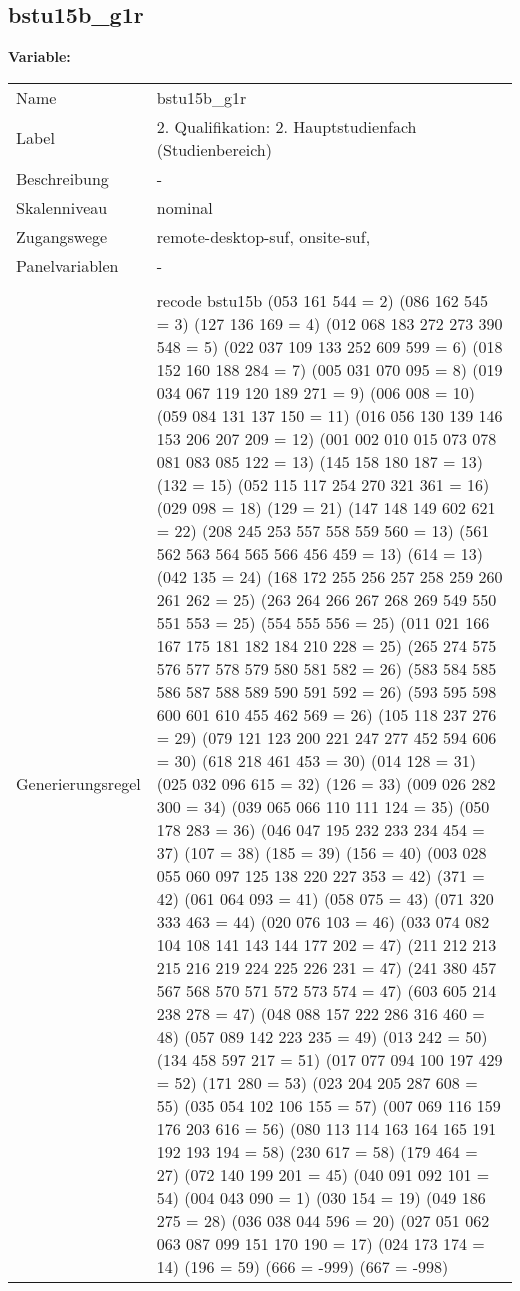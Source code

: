 	
	
	\subsection{bstu15b\_g1r}
	\label{subSection:bstu15b_g1r}

	\noindent\textbf{Variable:}\\
		\begin{tabular}{lL{11.3cm}}
			\label{tableVariable:bstu15b_g1r}
			Name & bstu15b\_g1r \\
			Label & 2. Qualifikation: 2. Hauptstudienfach (Studienbereich) \\
			Beschreibung & - \\
			Skalenniveau & nominal \\
			Zugangswege &
				remote-desktop-suf,
				onsite-suf,
 \\
			Panelvariablen & -
			 \\
			 \\
					Generierungsregel & recode bstu15b (053 161 544 = 2)  (086 162 545 = 3) (127 136 169 = 4) (012 068 183 272 273 390 548 = 5) (022 037 109 133 252 609 599 = 6) (018 152 160 188 284 = 7) (005 031 070 095 = 8) (019 034 067 119 120 189 271 = 9) (006 008 = 10) (059 084 131 137 150 = 11) (016 056 130 139 146 153 206 207 209   = 12) (001 002 010 015 073 078 081 083 085 122  = 13) (145 158 180 187 = 13) (132 = 15) (052 115 117 254 270 321 361 = 16) (029 098 = 18) (129 = 21) (147 148 149 602 621 = 22) (208 245 253 557 558 559 560 = 13) (561 562 563 564 565 566 456 459 = 13) (614 = 13) (042 135 = 24) (168 172 255 256 257 258 259 260 261 262  = 25) (263 264 266 267 268 269 549 550 551 553  = 25) (554 555 556 = 25) (011 021 166 167 175 181 182 184 210 228 = 25) (265 274 575 576 577 578 579 580 581 582 = 26) (583 584 585 586 587 588 589 590 591 592  = 26) (593 595 598 600 601 610 455 462 569 = 26) (105 118 237 276 = 29) (079 121 123 200 221 247 277 452 594 606 = 30) (618 218 461 453 = 30)  (014 128 = 31) (025 032 096 615 = 32) (126 = 33) (009 026 282 300 = 34) (039 065 066 110 111 124 = 35) (050 178 283 = 36) (046 047 195 232 233 234 454 = 37) (107 = 38)    (185 = 39) (156 = 40) (003 028 055 060 097 125 138 220 227 353 = 42)  (371 = 42)  (061 064 093 = 41) (058 075 = 43) (071 320 333 463 = 44)  (020 076 103 = 46) (033 074 082 104 108 141 143 144 177 202  = 47) (211 212 213 215 216 219 224 225 226 231  = 47) (241 380 457 567 568 570 571 572 573 574 = 47) (603 605 214 238 278 = 47) (048 088 157 222 286 316 460 = 48) (057 089 142 223 235 = 49) (013 242 = 50) (134 458 597 217 = 51) (017 077 094 100 197 429 = 52) (171 280 = 53) (023 204 205 287 608 = 55) (035 054 102 106 155 = 57) (007 069 116 159 176 203 616 = 56) (080 113 114 163 164 165 191 192 193 194  = 58) (230 617 = 58) (179 464 = 27) (072 140 199 201 = 45) (040 091 092 101 = 54) (004 043 090 = 1) (030 154 = 19) (049 186 275 = 28) (036 038 044 596 = 20) (027 051 062 063 087 099 151 170 190 = 17) (024 173 174 = 14) (196 = 59) (666 = -999) (667 = -998) 

\end{tabular}
